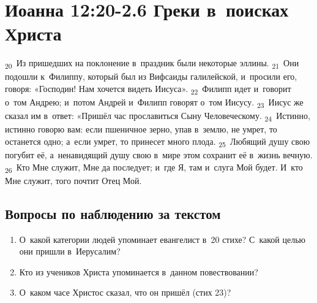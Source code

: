 \documentclass[a4paper,12pt]{article}
\begin{document}

\section{Иоанна 12:20-2.6 Греки в~поисках Христа}

\textsubscript{20}~Из пришедших на поклонение в~праздник были некоторые эллины.
\textsubscript{21}~Они подошли к~Филиппу, который был из Вифсаиды галилейской, и~просили его, говоря: «Господин! Нам хочется видеть Иисуса».
\textsubscript{22}~Филипп идет и~говорит о~том Андрею; и~потом Андрей и~Филипп говорят о~том Иисусу.
\textsubscript{23}~Иисус же сказал им в~ответ: «Пришёл час прославиться Сыну Человеческому.
\textsubscript{24}~Истинно, истинно говорю вам: если пшеничное зерно, упав в~землю, не умрет, то останется одно; а~если умрет, то принесет много плода.
\textsubscript{25}~Любящий душу свою погубит её, а~ненавидящий душу свою в~мире этом сохранит её в~жизнь вечную.
\textsubscript{26}~Кто Мне служит, Мне да последует; и~где Я, там и~слуга Мой будет. И~кто Мне служит, того почтит Отец Мой.

\subsection*{Вопросы по наблюдению за текстом}
\begin{enumerate}
    \item О~какой категории людей упоминает евангелист в~20 стихе? С~какой целью они пришли в~Иерусалим? 
    
    \myline
    
    \myline
    \item Кто из учеников Христа упоминается в~данном повествовании? 
    
    \myline
    
    \myline
    \item О~каком часе Христос сказал, что он пришёл (стих 23)? 
    
    \myline
    
    \myline
\end{enumerate}
\end{document}
